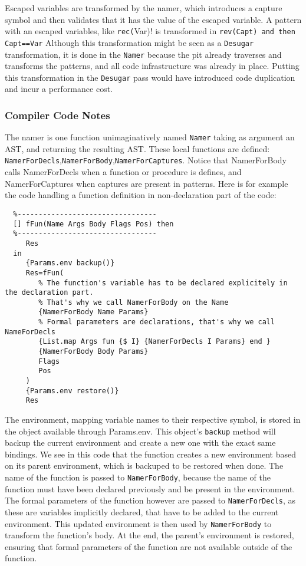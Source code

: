 \documentclass[a4paper]{memoir}
\begin{document}
Escaped variables are transformed by the namer, which introduces a capture
symbol and then validates that it has the value of the escaped variable.
 A pattern with an escaped variables, like \lstinline!rec(!Var)! is
transformed in \lstinline!rev(Capt) and then Capt==Var!
Although this transformation might be seen as a \lstinline!Desugar! transformation, it is
done in the \lstinline!Namer! because the pit already traverses and transforms the
patterns, and all code infrastructure was already in place. Putting this
transformation in the \lstinline!Desugar! pass would have introduced code duplication and
incur a performance cost.



\subsubsection{Compiler Code Notes}
The namer is one function unimaginatively named \lstinline!Namer! taking as argument an AST, and returning the resulting AST.
These local functions are defined: \lstinline!NamerForDecls!,\lstinline!NamerForBody!,\lstinline!NamerForCaptures!.
Notice that NamerForBody calls NamerForDecls when a function or procedure is defines, and NamerForCaptures when captures are present in patterns. Here is for example the code handling a function definition in non-declaration part of the code:

\begin{lstlisting}
  %---------------------------------
  [] fFun(Name Args Body Flags Pos) then
  %---------------------------------
     Res
  in
     {Params.env backup()} 
     Res=fFun(
        % The function's variable has to be declared explicitely in the declaration part.
        % That's why we call NamerForBody on the Name
        {NamerForBody Name Params}
        % Formal parameters are declarations, that's why we call NameForDecls
        {List.map Args fun {$ I} {NamerForDecls I Params} end }
        {NamerForBody Body Params}
        Flags
        Pos
     )
     {Params.env restore()}
     Res
\end{lstlisting}
The environment, mapping variable names to their respective symbol, is stored in the object available through Params.env. This object's \lstinline!backup! method will backup the current environment and create a new one with the exact same bindings.
We see in this code that the function creates a new environment based on its parent environment, which is backuped to be restored when done. The name of the function is passed to \lstinline!NamerForBody!, because the name of the function must have been declared previously and be present in the environment. 
The formal parameters of the function however are passed to \lstinline!NamerForDecls!, as these are variables implicitly declared, that have to be added to the current environment. This updated environment is then used by \lstinline!NamerForBody! to transform the function's body.
At the end, the parent's environment is restored, ensuring that formal parameters of the function are not available outside of the function.
\end{document}
